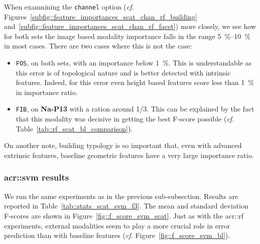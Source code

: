             When examnining the \texttt{channel} option (\textit{cf.} Figures~\ref{subfig::feature_importances_scat_chan_rf_building} and~\ref{subfig::feature_importances_scat_chan_rf_facet}) more closely, we see how for both sets the image based modality importance falls in the range \SIrange{5}{10}{\percent} in most cases.
            There are two cases where this is not the case:
            \begin{itemize}[label=\(\blacktriangleright\)]
                \item \texttt{FOS}, on both sets, with an importance below \SI{1}{\percent}.
                        This is understandable as this error is of topological nature and is better detected with intrinsic features.
                        Indeed, for this error even height based features score less than \SI{1}{\percent} in importance ratio.
                \item \texttt{FIB}, on \textbf{Na-P13} with a ration around 1/3.
                        This can be explained by the fact that this modality was decisive in getting the best F-score possible (\textit{cf.} Table~\ref{tab::rf_scat_bl_comparison}).
            \end{itemize}
            On another note, building typology is so important that, even with advanced extrinsic features, baseline geometric features have a very large importance ratio.

        \subsubsection{\texorpdfstring{\acrshort*{acr::svm}}{SVM} results}
            \label{subsubsec::more_experiments::richer_features::scatnet_baseline::svm}
            We run the same experiments as in the previous sub-subsection.
            Results are reported in Table~\ref{tab::stats_scat_svm_f3}.
            The mean and standard deviation F-scores are shown in Figure~\ref{fig::f_score_svm_scat}.
            Just as with the \gls{acr::rf} experiments, external modalities seem to play a more crucial role in error prediction than with baseline features (\textit{cf.} Figure~\ref{fig::f_score_svm_bl}).\\

